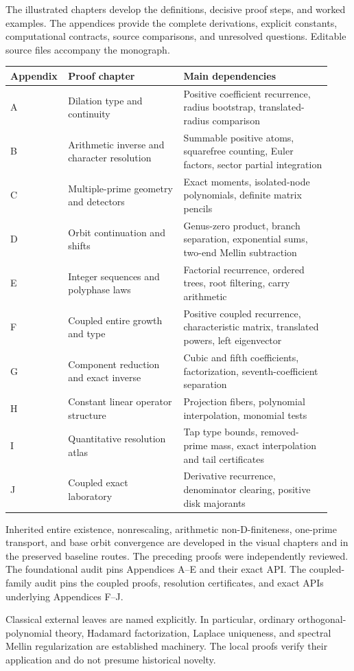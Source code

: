 The illustrated chapters develop the definitions, decisive proof steps, and worked examples. The appendices provide the complete derivations, explicit constants, computational contracts, source comparisons, and unresolved questions. Editable source files accompany the monograph.

\begin{tabular}{@{}p{0.13\linewidth}p{0.35\linewidth}p{0.45\linewidth}@{}}
\toprule
Appendix & Proof chapter & Main dependencies\\\midrule
A & Dilation type and continuity & Positive coefficient recurrence, radius bootstrap, translated-radius comparison\\
B & Arithmetic inverse and character resolution & Summable positive atoms, squarefree counting, Euler factors, sector partial integration\\
C & Multiple-prime geometry and detectors & Exact moments, isolated-node polynomials, definite matrix pencils\\
D & Orbit continuation and shifts & Genus-zero product, branch separation, exponential sums, two-end Mellin subtraction\\
E & Integer sequences and polyphase laws & Factorial recurrence, ordered trees, root filtering, carry arithmetic\\
F & Coupled entire growth and type & Positive coupled recurrence, characteristic matrix, translated powers, left eigenvector\\
G & Component reduction and exact inverse & Cubic and fifth coefficients, factorization, seventh-coefficient separation\\
H & Constant linear operator structure & Projection fibers, polynomial interpolation, monomial tests\\
I & Quantitative resolution atlas & Tap type bounds, removed-prime mass, exact interpolation and tail certificates\\
J & Coupled exact laboratory & Derivative recurrence, denominator clearing, positive disk majorants\\
\bottomrule\end{tabular}

Inherited entire existence, nonrescaling, arithmetic non-D-finiteness,
one-prime transport, and base orbit convergence are developed in the visual
chapters and in the preserved baseline routes. The preceding proofs were independently reviewed. The foundational audit pins Appendices
A--E and their exact API. The coupled-family audit pins the coupled proofs,
resolution certificates, and exact APIs underlying Appendices F--J.

Classical external leaves are named explicitly. In particular, ordinary
orthogonal-polynomial theory, Hadamard factorization, Laplace uniqueness,
and spectral Mellin regularization are established machinery. The local
proofs verify their application and do not presume historical novelty.

\clearpage\appendix

\clearpage
\clearpage
\clearpage
\clearpage\begingroup\setlength{\parskip}{3pt}\endgroup
